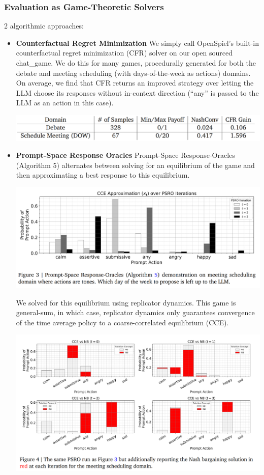\documentclass[12pt]{article}
\begin{document}
\subsubsection*{Evaluation as Game-Theoretic Solvers}
2 algorithmic approaches:
\begin{itemize}
  \item \textbf{Counterfactual Regret Minimization} We
  simply call OpenSpiel's built-in counterfactual regret minimization (CFR) solver on our open sourced
  chat\_game. We do this for many games, procedurally generated for both the debate and meeting scheduling (with days-of-the-week as actions) domains.
  On average, we find that CFR returns an improved strategy over letting the LLM choose its responses without in-context direction (``any'' is passed to the LLM as an action in this case).
  \begin{center}
    \includegraphics*[scale = 0.5]{table8.png}
  \end{center}
  \item \textbf{Prompt-Space Response Oracles} Prompt-Space Response-Oracles (Algorithm 5) alternates between solving for an equilibrium of the
  game and then approximating a best response to this equilibrium.
  \begin{center}
    \includegraphics*[scale = 0.5]{table9.png}
  \end{center}
  We solved for
  this equilibrium using replicator dynamics. This game is general-sum,
  in which case, replicator dynamics only guarantees convergence of the time average policy to a
  coarse-correlated equilibrium (CCE).
  \begin{center}
    \includegraphics*[scale = 0.5]{table10.png}

\end{center}
\end{itemize}
\end{document}
